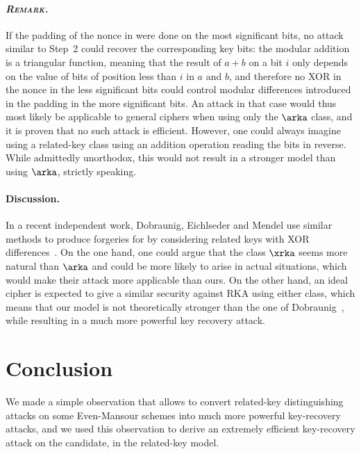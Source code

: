 \paragraph{\emph{\textsc{Remark.}}} If the padding of the nonce in \proestotr were done on the most significant bits, no attack similar
to Step~2 could recover
the corresponding key bits: the modular addition is a triangular function, meaning that the result of $a + b$ on a bit $i$ only
depends on the value of bits of position less than $i$ in $a$ and $b$, and therefore no XOR in the nonce in the less
significant bits could control modular differences introduced in the padding in the more significant bits. An attack in that case would thus most likely
be applicable to general ciphers when using only the $\arka$ class, and it is proven that no such attack is efficient.
However, one could always imagine using a related-key class using an addition operation reading the bits in reverse. While
admittedly unorthodox, this would not result in a stronger model than using $\arka$, strictly speaking.

\paragraph{Discussion.}

In a recent independent work, Dobraunig, Eichlseder and Mendel use similar methods to produce forgeries for \proestotr by considering
related keys with XOR differences~\cite{DEM15}. On the one hand, one could argue that the class $\xrka$ seems more natural than $\arka$
and could be more likely to arise in actual situations, which would
make their attack more applicable than ours. On the other hand, an ideal cipher is expected to give a similar security against
RKA using either class, which means that our model is not theoretically stronger than the one of Dobraunig~\etal, while resulting in a
much more powerful key recovery attack.

\section{Conclusion}

We made a simple observation that allows to convert related-key distinguishing attacks on some Even-Mansour schemes into much more
powerful key-recovery attacks, and we used this observation to derive an extremely efficient key-recovery attack on the
\proestotr \caesar candidate, in the related-key model.

